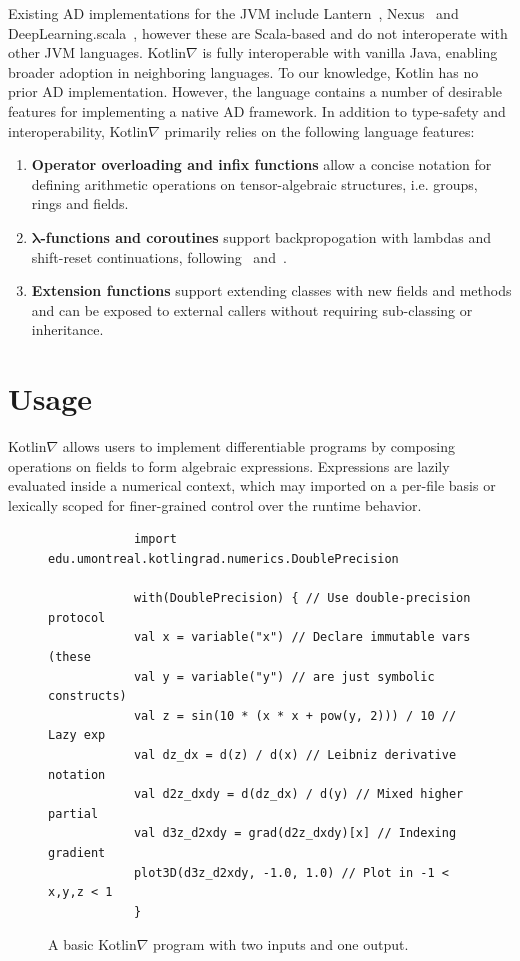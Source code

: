 \documentclass{article}
\newcommand{\squeezeup}{\vspace{-2.5mm}}
\begin{document}
    Existing AD implementations for the JVM include Lantern~\cite{DBLP:journals/corr/abs-1803-10228}, Nexus~\cite{chen2017typesafe} and DeepLearning.scala~\cite{dl4s}, however these are Scala-based and do not interoperate with other JVM languages. Kotlin$\nabla$ is fully interoperable with vanilla Java, enabling broader adoption in neighboring languages. To our knowledge, Kotlin has no prior AD implementation. However, the language contains a number of desirable features for implementing a native AD framework. In addition to type-safety and interoperability, Kotlin$\nabla$ primarily relies on the following language features:
    \squeezeup\squeezeup
    \begin{enumerate}[itemsep=-0.5ex]
        \item \textbf{Operator overloading and infix functions} allow a concise notation for defining arithmetic operations on tensor-algebraic structures, i.e. groups, rings and fields.
        \item \textbf{$\mathbf{\lambda}$-functions and coroutines} support backpropogation with lambdas and shift-reset continuations, following~\citealt{pearlmutter2008reverse} and~\citealt{DBLP:journals/corr/abs-1803-10228}.
        \item \textbf{Extension functions} support extending classes with new fields and methods and can be exposed to external callers without requiring sub-classing or inheritance.
    \end{enumerate}
    \squeezeup\squeezeup
    \section{Usage}

    Kotlin$\nabla$ allows users to implement differentiable programs by composing operations on fields to form algebraic expressions. Expressions are lazily evaluated inside a numerical context, which may imported on a per-file basis or lexically scoped for finer-grained control over the runtime behavior.

    \begin{figure}[!htb]
        \begin{verbatim}
            import edu.umontreal.kotlingrad.numerics.DoublePrecision

            with(DoublePrecision) { // Use double-precision protocol
            val x = variable("x") // Declare immutable vars (these
            val y = variable("y") // are just symbolic constructs)
            val z = sin(10 * (x * x + pow(y, 2))) / 10 // Lazy exp
            val dz_dx = d(z) / d(x) // Leibniz derivative notation
            val d2z_dxdy = d(dz_dx) / d(y) // Mixed higher partial
            val d3z_d2xdy = grad(d2z_dxdy)[x] // Indexing gradient
            plot3D(d3z_d2xdy, -1.0, 1.0) // Plot in -1 < x,y,z < 1
            }
        \end{verbatim}
        \squeezeup\squeezeup
        \caption{A basic Kotlin$\nabla$ program with two inputs and one output.}
        \label{label:fig1}
    \end{figure}
\end{document}
